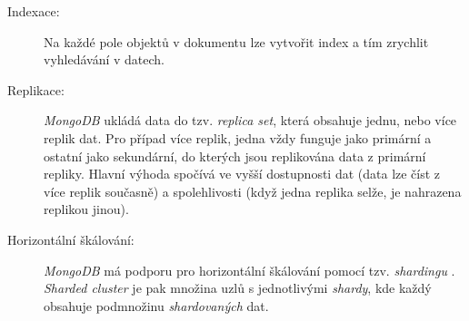 \begin{description}
    \begin{description}
        \item[Indexace:] Na každé pole objektů v dokumentu lze vytvořit index a tím zrychlit vyhledávání v datech.
        \item[Replikace:] \textit{MongoDB} ukládá data do tzv. \textit{replica set}, která obsahuje jednu, nebo více replik dat. Pro případ více replik, jedna vždy funguje jako primární a ostatní jako sekundární, do kterých jsou replikována data z primární repliky. Hlavní výhoda spočívá ve vyšší dostupnosti dat (data lze číst z více replik současně) a spolehlivosti (když jedna replika selže, je nahrazena replikou jinou).
        \item[Horizontální škálování:] \textit{MongoDB} má podporu pro horizontální škálování pomocí tzv. \textit{shardingu} \cite{mongodb-scale}. \textit{Sharded cluster} je pak množina uzlů s jednotlivými \textit{shardy}, kde každý obsahuje podmnožinu \textit{shardovaných} dat.
    \end{description}

\end{description}